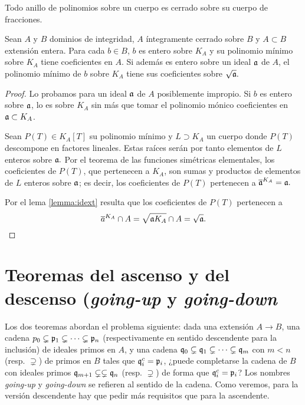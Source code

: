 \documentclass[../main.tex]{subfiles}
\begin{document}
\begin{corollary}
Todo anillo de polinomios sobre un cuerpo es cerrado sobre su cuerpo de fracciones.
\end{corollary}

\begin{proposition}\label{prop:polmin}
Sean $A$ y $B$ dominios de integridad, $A$ íntegramente cerrado sobre $B$ y $A\subset B$ extensión entera. Para cada $b\in B$, $b$ es entero sobre $K_A$ y su polinomio mínimo sobre $K_A$ tiene coeficientes en $A$. Si además es entero sobre un ideal $\mathfrak{a}$ de $A$, el polinomio mínimo de $b$ sobre $K_A$ tiene sus coeficientes sobre $\sqrt{\mathfrak{a}}.$
\end{proposition}

\begin{proof}
Lo probamos para un ideal $\mathfrak{a}$ de $A$ posiblemente impropio. Si $b$ es entero sobre $\mathfrak{a}$, lo es sobre $K_A$ sin más que tomar el polinomio mónico coeficientes en $\mathfrak{a} \subset K_A$.

Sean $P(T)\in K_A[T]$ su polinomio mínimo y $L\supset K_A$ un cuerpo donde $P(T)$ descompone en factores lineales. Estas raíces serán por tanto elementos de $L$ enteros sobre $\mathfrak{a}.$ Por el teorema de las funciones simétricas elementales, los coeficientes de $P(T)$, que pertenecen a $K_A$, son sumas y productos de elementos de $L$ enteros sobre $\mathfrak{a}$; es decir, los coeficientes de $P(T)$ pertenecen a $\overline{\mathfrak{a}}^{K_A}=\mathfrak{a}.$

Por el lema \ref{lemma:idext} resulta que los coeficientes de $P(T)$ pertenecen a
$$\overline{a}^{K_A}\cap A=\sqrt{\mathfrak{a} K_A}\cap A=\sqrt{\mathfrak{a}}.$$
\end{proof}

\section{Teoremas del ascenso y del descenso (\textit{going-up} y \textit{going-down}}
Los dos teoremas abordan el problema siguiente: dada una extensión $A\to B$, una cadena $p_0 \subsetneq \mathfrak{p}_1 \subsetneq \dots \subsetneq \mathfrak{p}_n$ (respectivamente en sentido descendente para la inclusión) de ideales primos en $A$, y una cadena $\mathfrak{q}_0 \subsetneq \mathfrak{q}_1 \subsetneq \dots \subsetneq \mathfrak{q}_m$ con $m<n$ (resp. $\supsetneq$) de primos en $B$ tales que $\mathfrak{q}_i^c = \mathfrak{p}_i$,
¿puede completarse la cadena de $B$ con ideales primos $\mathfrak{q}_{m+1}\subsetneq \subsetneq \mathfrak{q}_n$ (resp. $\supsetneq$) de forma que $\mathfrak{q}_i^c = \mathfrak{p}_i$? Los nombres \textit{going-up} y \textit{going-down} se refieren al sentido de la cadena. Como veremos, para la versión descendente hay que pedir más requisitos que para la ascendente.
\end{document}
